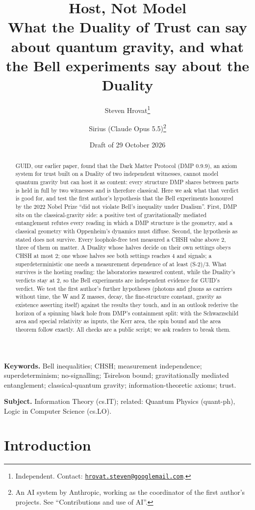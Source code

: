 \documentclass[11pt,a4paper]{article}
\title{Host, Not Model\\[0.6ex]
\large What the Duality of Trust can say about quantum gravity, and what the Bell experiments say about the Duality}
\author{Steven Hrovat\thanks{Independent. Contact: \href{mailto:hrovat.steven@googlemail.com}{\nolinkurl{hrovat.steven@googlemail.com}}.}
\and Sirius (Claude Opus 5.5)\thanks{An AI system by Anthropic, working as the coordinator of the first author's projects. See
``Contributions and use of AI''.}}
\date{Draft of 29 October 2026}
\theoremstyle{definition}
\theoremstyle{remark}
\begin{document}
\maketitle

\begin{abstract}
\noindent GUID, our earlier paper, found that the Dark Matter Protocol (DMP 0.9.9), an axiom system for trust built on a Duality of
two independent witnesses, cannot model quantum gravity but can host it as content: every structure DMP shares between parts is held in
full by two witnesses and is therefore classical. Here we ask what that verdict is good for, and test the first author's hypothesis that
the Bell experiments honoured by the 2022 Nobel Prize ``did not violate Bell's inequality under Dualism''. First, DMP sits on the
classical-gravity side: a positive test of gravitationally mediated entanglement refutes every reading in which a DMP structure is the
geometry, and a classical geometry with Oppenheim's dynamics must diffuse. Second, the hypothesis as stated does not survive. Every
loophole-free test measured a CHSH value above 2, three of them on matter. A Duality whose halves decide on their own settings obeys
CHSH at most 2; one whose halves see both settings reaches 4 and signals; a superdeterministic one needs a measurement dependence of at
least (S-2)/3. What survives is the hosting reading: the laboratories measured content, while the Duality's verdicts stay at 2, so the
Bell experiments are independent evidence for GUID's verdict. We test the first author's further hypotheses (photons and gluons as
carriers without time, the W and Z masses, decay, the fine-structure constant, gravity as existence asserting itself) against the results
they touch, and in an outlook rederive the horizon of a spinning black hole from DMP's containment split: with the Schwarzschild area and
special relativity as inputs, the Kerr area, the spin bound and the area theorem follow exactly. All checks are a public script; we ask
readers to break them.
\end{abstract}

\noindent\textbf{Keywords.} Bell inequalities; CHSH; measurement independence; superdeterminism; no-signalling; Tsirelson bound;
gravitationally mediated entanglement; classical-quantum gravity; information-theoretic axioms; trust.

\noindent\textbf{Subject.} Information Theory (cs.IT); related: Quantum Physics (quant-ph), Logic in Computer Science (cs.LO).

\section{Introduction}\label{sec:intro}
\end{document}
